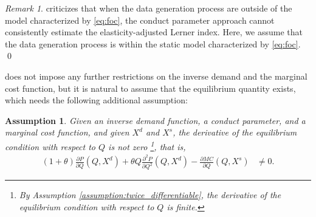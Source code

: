 \documentclass[11pt, a4paper]{article}
\newtheorem{assumption}{Assumption}
\theoremstyle{remark}
\newtheorem{remark}{Remark}
\begin{document}
\begin{remark}
    \citet{corts1999conduct} criticizes that when the data generation process are outside of the model characterized by \eqref{eq:foc}, the conduct parameter approach cannot consistently estimate the elasticity-adjusted Lerner index. Here, we assume that the data generation process is within the static model characterized by \eqref{eq:foc}. \qed
\end{remark}


\citet{lau1982identifying} does not impose any further restrictions on the inverse demand and the marginal cost function, but it is natural to assume that the equilibrium quantity exists, which needs the following additional assumption:
\begin{assumption}\label{assumption:unique_equilibrium}
    Given an inverse demand function, a conduct parameter, and a marginal cost function, and given $X^{d}$ and $X^{s}$, the derivative of the equilibrium condition with respect to $Q$ is not zero \footnote{By Assumption \ref{assumption:twice_differentiable}, the derivative of the equilibrium condition with respect to $Q$ is finite.}, that is,
    \begin{align}
        (1+\theta)\frac{\partial P}{\partial Q}(Q, X^{d}) + \theta Q\frac{\partial^2 P}{\partial Q^2}(Q, X^{d}) - \frac{\partial MC}{\partial Q}(Q, X^{s}) & \ne 0.
    \end{align}
\end{assumption}



\end{document}
